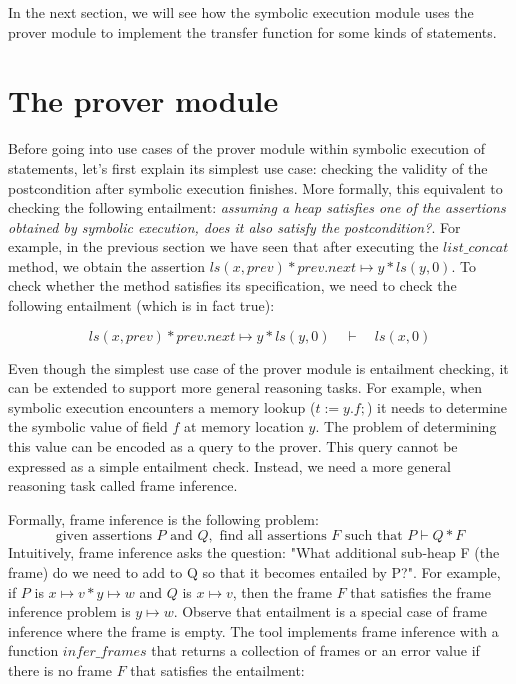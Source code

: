 \documentclass{article}
\begin{document}
In the next section, we will see how the symbolic execution module uses the prover module to implement the transfer function for some kinds of statements.

\section{The prover module}

Before going into use cases of the prover module within symbolic execution of statements,
let's first explain its simplest use case: checking the validity of the postcondition after symbolic execution finishes.
More formally, this equivalent to checking the following entailment: \textit{assuming a heap satisfies one of the assertions obtained by symbolic execution, does it also satisfy the postcondition?}.
For example, in the previous section we have seen that after executing the $list\_concat$ method, we obtain the assertion $ls(x, prev) * prev.next \mapsto y * ls(y, 0)$.
To check whether the method satisfies its specification, we need to check the following entailment (which is in fact true):

$$ ls(x, prev) * prev.next \mapsto y * ls(y, 0) \quad \vdash \quad ls(x, 0) $$

Even though the simplest use case of the prover module is entailment checking, it can be extended to support more general reasoning tasks.
For example, when symbolic execution encounters a memory lookup ($t := y.f;$) it needs to determine the symbolic value of field $f$ at memory location $y$.
The problem of determining this value can be encoded as a query to the prover.
This query cannot be expressed as a simple entailment check.
Instead, we need a more general reasoning task called frame inference.

Formally, frame inference is the following problem:
$$ \text{given assertions } P \text{ and } Q, \text{ find all assertions } F \text{ such that } P \vdash Q * F $$
Intuitively, frame inference asks the question: "What additional sub-heap F (the frame) do we need to add to Q so that it becomes entailed by P?".
For example, if $P$ is $x \mapsto v * y \mapsto w$ and $Q$ is $x \mapsto v$, then the frame $F$ that satisfies the frame inference problem is $y \mapsto w$.
Observe that entailment is a special case of frame inference where the frame is empty.
The tool implements frame inference with a function $infer\_frames$ that returns a collection of frames or an error value if there is no frame $F$ that satisfies the entailment:
\end{document}
